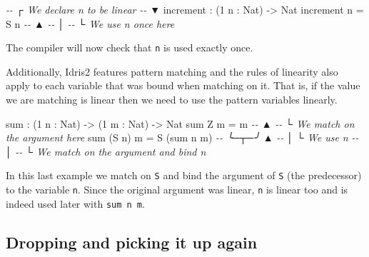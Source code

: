 \documentclass[
]{article}
\newenvironment{Shaded}{}{}
\newcommand{\CommentTok}[1]{\textcolor[rgb]{0.38,0.63,0.69}{\textit{#1}}}
\newcommand{\DataTypeTok}[1]{\textcolor[rgb]{0.56,0.13,0.00}{#1}}
\newcommand{\DecValTok}[1]{\textcolor[rgb]{0.25,0.63,0.44}{#1}}
\newcommand{\FunctionTok}[1]{\textcolor[rgb]{0.02,0.16,0.49}{#1}}
\newcommand{\NormalTok}[1]{#1}
\newcommand{\OperatorTok}[1]{\textcolor[rgb]{0.40,0.40,0.40}{#1}}
\newcommand{\OtherTok}[1]{\textcolor[rgb]{0.00,0.44,0.13}{#1}}
\begin{document}
\begin{Shaded}
\begin{Highlighting}[]
\CommentTok{{-}{-}           ┌ We declare \textasciigrave{}n\textasciigrave{} to be linear}
\CommentTok{{-}{-}           ▼}
\NormalTok{increment }\OperatorTok{:}\NormalTok{ (}\DecValTok{1}\NormalTok{ n }\OperatorTok{:} \DataTypeTok{Nat}\NormalTok{) }\OtherTok{{-}\textgreater{}} \DataTypeTok{Nat}
\NormalTok{increment n }\OtherTok{=} \DataTypeTok{S}\NormalTok{ n}
\CommentTok{{-}{-}              ▲}
\CommentTok{{-}{-}              │}
\CommentTok{{-}{-}              └ We use n once here}
\end{Highlighting}
\end{Shaded}

The compiler will now check that \texttt{n} is used exactly once.

Additionally, Idris2 features pattern matching and the rules of
linearity also apply to each variable that was bound when matching on
it. That is, if the value we are matching is linear then we need to use
the pattern variables linearly.

\begin{Shaded}
\begin{Highlighting}[]
\FunctionTok{sum} \OperatorTok{:}\NormalTok{ (}\DecValTok{1}\NormalTok{ n }\OperatorTok{:} \DataTypeTok{Nat}\NormalTok{) }\OtherTok{{-}\textgreater{}}\NormalTok{ (}\DecValTok{1}\NormalTok{ m }\OperatorTok{:} \DataTypeTok{Nat}\NormalTok{) }\OtherTok{{-}\textgreater{}} \DataTypeTok{Nat}
\FunctionTok{sum} \DataTypeTok{Z}\NormalTok{ m }\OtherTok{=}\NormalTok{ m}
\CommentTok{{-}{-}  ▲}
\CommentTok{{-}{-}  └ We match on the argument here}
\FunctionTok{sum}\NormalTok{ (}\DataTypeTok{S}\NormalTok{ n) m }\OtherTok{=} \DataTypeTok{S}\NormalTok{ (}\FunctionTok{sum}\NormalTok{ n m)}
\CommentTok{{-}{-}  ╰─┬─╯            ▲}
\CommentTok{{-}{-}    │              └ We use \textasciigrave{}n\textasciigrave{}}
\CommentTok{{-}{-}    │}
\CommentTok{{-}{-}    └ We match on the argument and bind \textasciigrave{}n\textasciigrave{}}
\end{Highlighting}
\end{Shaded}

In this last example we match on \texttt{S} and bind the argument of
\texttt{S} (the predecessor) to the variable \texttt{n}. Since the
original argument was linear, \texttt{n} is linear too and is indeed
used later with \texttt{sum\ n\ m}.

\hypertarget{dropping-and-picking-it-up-again}{%
\subsection{Dropping and picking it up
again}\label{dropping-and-picking-it-up-again}}
\end{document}
